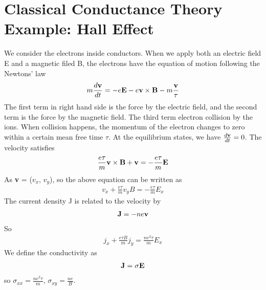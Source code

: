 \documentclass[a4paper]{article}
\begin{document}
\section{Classical Conductance Theory Example: Hall Effect}
We consider the electrons inside conductors. When we apply both an electric field E and a magnetic filed B, the electrons have the equation of motion following the Newtons' law
\begin{align*}
	m \frac{d\bf v}{dt} = -e {\bf E} - e {\bf v} \times {\bf B} - m\frac{\bf v}{\tau}
\end{align*}
The first term in right hand side is the force by the electric field, and the second term is the force by the magnetic field. The third term electron collision by the ions. When collision happens, the momentum of the electron changes to zero within a certain mean free time $\tau$. At the equilibrium states, we have $\frac{d {\bf v}}{d t} = 0$. The velocity satisfies 
\begin{align}
	  \frac{e\tau}{m} {\bf v} \times {\bf B} + {\bf v} = - \frac{e \tau}{m} {\bf E}
\end{align}
As {\bf v} = ($v_x$, $v_y$), so the above equation can be written as
\begin{align*}
	v_x + \frac{e \tau}{m} v_y B = -\frac{e \tau}{m} E_x
\end{align*}
The current density J is related to the velocity by
\begin{align*}
	{\bf J} = - n e {\bf v}
\end{align*}
So 
\begin{align*}
	j_x + \frac{e \tau B} {m} j_y  = \frac{n e^2 \tau}{m} E_x
\end{align*}
We define the conductivity as 
\begin{align*}
	{\bf J} = \sigma {\bf E}
\end{align*}
so $\sigma_{xx} =\frac{n e^2 \tau}{m}$, $\sigma_{xy} =\frac{ne}{B}$.\\  
\end{document}
